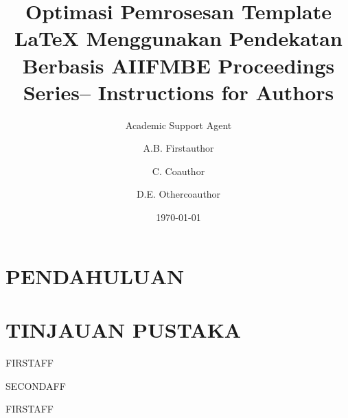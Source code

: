 \documentclass{ifmbe}
\title{Optimasi Pemrosesan Template LaTeX Menggunakan Pendekatan Berbasis AI}
\author{Academic Support Agent}
\date{\today}
\begin{document}
\maketitle

\begin{abstract}

\end{abstract}

\chapter{PENDAHULUAN}


\chapter{TINJAUAN PUSTAKA}



\title{IFMBE Proceedings Series-- Instructions for Authors}


\author{A.B. Firstauthor}{FIRSTAFF}
\author{C. Coauthor}{SECONDAFF}
\author{D.E. Othercoauthor}{FIRSTAFF}
\end{document}
